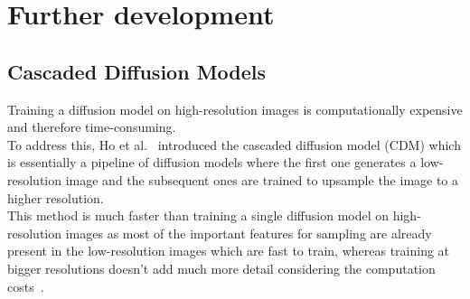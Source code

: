 \documentclass[twoside]{article}
\numberwithin{equation}{section}
\numberwithin{figure}{section}
\begin{document}
\section{Further development}
\subsection{Cascaded Diffusion Models}
Training a diffusion model on high-resolution images is computationally expensive and therefore time-consuming. \\
To address this, Ho et al.~\cite{ho2021cascaded} introduced the cascaded diffusion model (CDM) which is essentially a pipeline of diffusion models where the first one generates a low-resolution image and the subsequent ones are trained to upsample the image to a higher resolution. \\
This method is much faster than training a single diffusion model on high-resolution images as most of the important features for sampling are already present in the low-resolution images which are fast to train, whereas training at bigger resolutions doesn't add much more detail considering the computation costs~\cite{ho2021cascaded}.
\end{document}
